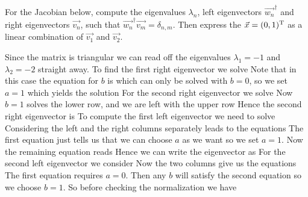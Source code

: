 For the Jacobian below, compute the eigenvalues $\lambda_n$, left eigenvectors $\vec{w_n}^\dag$ and right eigenvectors $\vec{v_n}$, such that $\vec{w_n}^{\dag}\vec{v_m}=\delta_{n,m}$. Then express the $\vec{x}=(0,1)^{\rm T}$ as a linear combination of $\vec{v_1}$ and $\vec{v_2}$. 


\solution 
Since the matrix is triangular we can read off the eigenvalues $\lambda_1=-1$ and $\lambda_2=-2$ straight away. To find the first right eigenvector we solve 
Note that in this case the equation for $b$ is 
which can only be solved with $b=0$, so we set $a=1$ which yields the solution 
For the second right eigenvector we solve 
Now $b=1$ solves the lower row, and we are left with the upper row
Hence the second right eigenvector is 
To compute the first left eigenvector we need to solve 
Considering the left and the right columns separately leads to the equations 
The first equation just tells us that we can choose $a$ as we want so we set $a=1$. Now the remaining equation reads 
Hence we can write the eigenvector as  
For the second left eigenvector we consider 
Now the two columns give us the equations 
The first equation requires $a=0$. Then any $b$ will satisfy the second equation so we choose $b=1$. So before checking the normalization we have  
